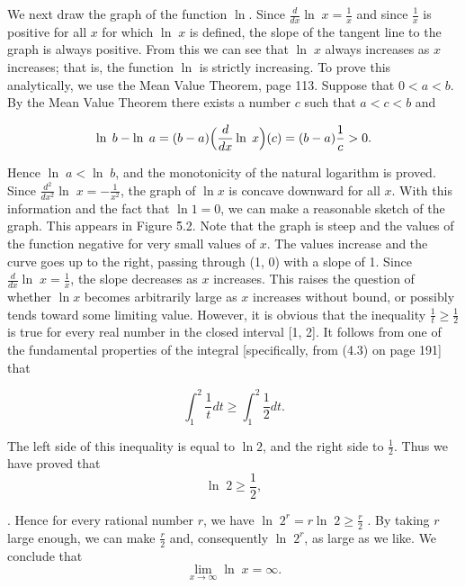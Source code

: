 We next draw the graph of the function $\ln$. Since $\frac{d}{dx} \ln\; x = \frac{1}{x}$ and since $\frac{1}{x}$ is positive for all $x$ for which $\ln\; x$ is defined, the slope of the tangent line to the graph is always positive. From this we can see that $\ln\; x$ always increases as $x$ increases; that is, the function $\ln$ is strictly increasing. To prove this analytically, we use the Mean Value Theorem, page 113. Suppose that $0 < a < b$. By the Mean Value Theorem there exists a number $c$ such that $a < c < b$ and

$$
\ln\; b - \ln\; a = (b - a) \Bigl( \frac{d}{dx} \ln\; x \Bigr) (c) = (b - a) \frac{1}{c} > 0.
$$


\noindent Hence $\ln\; a < \ln\; b$, and the monotonicity of the natural logarithm is proved. Since $\frac{d^2}{dx^2} \ln\; x = - \frac{1}{x^2}$, the graph of $\ln x$ is concave downward for all $x$. With this information and the fact that $\ln 1 = 0$, we can make a reasonable sketch of the graph. This appears in Figure \f{5.2}. Note that the graph is steep and the values of the function negative for very small values of $x$. The values increase and the curve goes up to the right, passing through (1, 0) with a
slope of 1. Since $\frac{d}{dx} \ln\; x = \frac{1}{x}$, the slope decreases as $x$ increases. This raises the question of whether $\ln x$ becomes arbitrarily large as $x$ increases without bound, or possibly tends toward some limiting value. However, it is obvious that the inequality $\frac{1}{t} \geq \frac{1}{2}$ is true for every real number in the closed interval [1, 2]. It follows from one of the fundamental properties of the integral [specifically, from (4.3) on page 191] that

$$
\int_{1}^{2} \frac{1}{ t} dt \geq \int_{1}^{2} \frac{1}{2} dt.
$$

\noindent The left side of this inequality is equal to $\ln 2$, and the right side to $\frac{1}{2}$. Thus we have proved that
$$
\ln\; 2 \geq \frac{1}{2},
$$

\noindent [a fact which can also be obtained geometrically by looking at Figure \f{5.1}(a) and considering the area under the curve $y = \frac{1}{t}$ between $t = 1$ and  $t = 2$]. Hence for every rational number $r$, we have $\ln\; 2^r = r \ln\; 2 \geq \frac{r}{2}$ . By taking $r$ large enough, we can make $\frac{r}{2}$ and, consequently $\ln\; 2^r$, as large as we like. We conclude that
$$
\lim_{x \rightarrow \infty} \ln\; x = \infty.
$$

